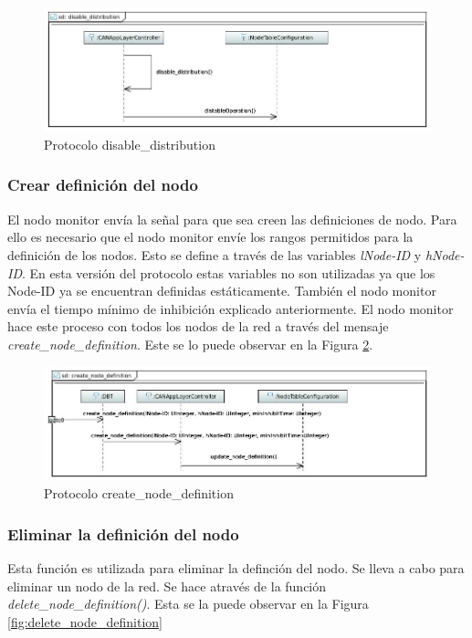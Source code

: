 \begin{figure}[h!]
 \centering
 \includegraphics[scale=0.4]{images/Secciones/AppendixA/disable_distribution.JPG}
  \caption{Protocolo disable\_distribution}
\label{fig:disable_distribution}
\end{figure}


\subsubsection{Crear definición del nodo}
El nodo monitor envía la señal para que sea creen las definiciones de nodo. Para
ello es necesario que el nodo monitor envíe los rangos permitidos para la
definición de los nodos. Esto se define a través de las variables
\textit{lNode-ID} y \textit{hNode-ID}. En esta versión del protocolo estas
variables no son utilizadas ya que los Node-ID ya se encuentran definidas
estáticamente. También el nodo monitor envía el tiempo mínimo de inhibición
explicado anteriormente. El nodo monitor hace este proceso con todos los nodos
de la red a través del mensaje \textit{create\_node\_definition}. Este se lo
puede observar en la Figura \ref{fig:create_node_definition}.

\begin{figure}[h!]
 \centering
 \includegraphics[scale=0.4]{images/Secciones/AppendixA/create_node_definition.JPG}
  \caption{Protocolo create\_node\_definition}
\label{fig:create_node_definition}
\end{figure}


\subsubsection{Eliminar la definición del nodo}
Esta función es utilizada para eliminar la definción del nodo. Se lleva a cabo
para eliminar un nodo de la red. Se hace através de la función
\textit{delete\_node\_definition()}. Esta se la puede observar en la Figura
\ref{fig:delete_node_definition}

